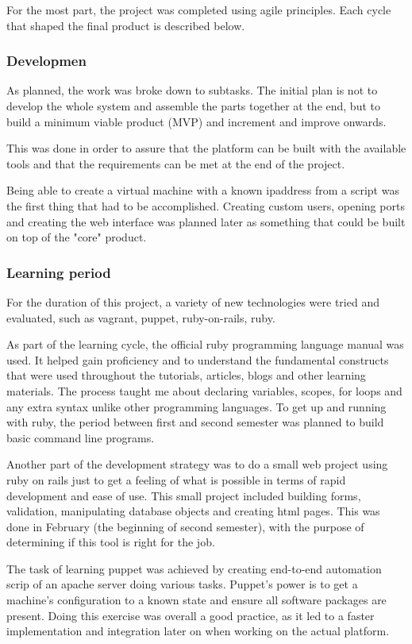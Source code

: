 \documentclass{article}
\begin{document}
For the most part, the project was completed using agile principles. Each cycle that shaped the final product is described below.
\subsubsection{Developmen}
As planned, the work was broke down to subtasks. The initial plan is not to develop the whole system and assemble the parts together at the end, but to build a minimum viable product (MVP) and increment and improve onwards.

This was done in order to assure that the platform can be built with the available tools and that the requirements can be met at the end of the project.

Being able to create a virtual machine with a known \gls{ipaddress} from a script was the first thing that had to be accomplished. Creating custom users, opening ports and creating the web interface was planned later as something that could be built on top of the "core" product.

\subsubsection{Learning period}
For the duration of this project, a variety of new technologies were tried and evaluated, such as \gls{vagrant}, \gls{puppet}, \gls{ruby-on-rails}, \gls{ruby}.

As part of the learning cycle, the official ruby programming language manual was used. It helped gain proficiency and to understand the fundamental constructs that were used throughout the tutorials, articles, blogs and other learning materials. The process taught me about declaring variables, scopes, for loops and any extra syntax unlike other programming languages. To get up and running with \gls{ruby}, the period between first and second semester was planned to build basic command line programs.

Another part of the development strategy was to do a small web project using ruby on rails just to get a feeling of what is possible in terms of rapid development and ease of use. This small project included building forms, validation, manipulating database objects and creating \gls{html} pages. This was done in February (the beginning of second semester), with the purpose of determining if this tool is right for the job.

The task of learning \gls{puppet} was achieved by creating end-to-end automation scrip of an apache server doing various tasks. Puppet's power is to get a machine's configuration to a known state and ensure all software packages are present. Doing this exercise was overall a good practice, as it led to a faster implementation and integration later on when working on the actual platform.
\end{document}
